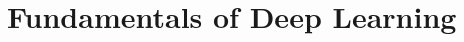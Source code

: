 \setcounter{chapter}{0}

\hypertarget{fundamentals-of-deep-learning}{%
\chapter{Fundamentals of Deep Learning}\label{fundamentals-of-deep-learning}}
